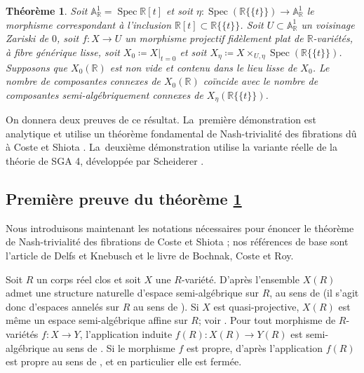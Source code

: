 \documentclass[JEP,XML,SOM,Unicode,francais,published]{cedram}
\newtheorem{thm}{Théorème}[section]
\theoremstyle{definition}
\newcommand{\R}{\mathbb R}
\newcommand{\A}{\mathbb A}
\newcommand{\Spec}{\operatorname{Spec}}
\newcommand{\puiseux}{\mathbb{R}\{\!\{t\}\!\}}
\begin{document}
\begin{thm}\label{critere-connexe}
Soit $\A^1_\R=\Spec \R[t]$ et soit $\eta\colon \Spec(\puiseux)\to \A^1_\R$ le morphisme correspondant à l'inclusion $\R[t]\subset \puiseux$. Soit $U\subset \A^1_\R$ un voisinage Zariski de $0$, soit $f\colon X\to U$ un morphisme projectif fidèlement plat de $\R$-variétés, à fibre générique lisse, soit $X_0\coloneqq X|_{t=0}$ et soit $X_\eta\coloneqq X\times_{U,\eta}\Spec(\puiseux)$. Supposons que $X_0(\R)$ est non vide et contenu dans le lieu lisse de $X_0$. Le nombre de composantes connexes de $X_0(\R)$ coïncide avec le nombre de composantes semi-algébriquement connexes de $X_\eta(\puiseux)$.
\end{thm}

On donnera deux preuves de ce résultat. La~première démonstration est analytique et utilise un théorème fondamental de Nash-trivialité des fibrations dû à Coste et Shiota \cite{coste1992nash}. La~deuxième démonstration utilise la variante réelle de la théorie de SGA 4, développée par Scheiderer \cite{scheiderer1994real}.

\subsection{Première preuve du théorème \ref{critere-connexe}}

Nous introduisons maintenant les notations nécessaires pour énoncer le théorème de Nash-trivialité des fibrations
de Coste et Shiota \cite{coste1992nash}; nos références de base sont l'article \cite{delfs1981semialgebraicII} de Delfs et Knebusch et le livre \cite{bochnak1998real} de Bochnak, Coste et Roy.

Soit $R$ un corps réel clos et soit $X$ une $R$-variété. D'après \cite[Ex.\,2 p.\,182]{delfs1981semialgebraicII} l'ensemble $X(R)$ admet une structure naturelle d'espace semi-algébrique sur $R$, au sens de \cite[Def.\,3 p.\,182]{delfs1981semialgebraicII} (il s'agit donc d'espaces annelés sur $R$ au sens de \cite[Def.\,2 p.\,182]{delfs1981semialgebraicII}). Si $X$ est quasi-projective, $X(R)$ est même un espace semi-algébrique affine sur $R$; voir \cite[Rem.\ p.\,182]{delfs1981semialgebraicII}. Pour tout morphisme de $R$-variétés $f\colon X\to Y$, l'application induite $f(R)\colon X(R)\to Y(R)$ est semi-algébrique au sens de \cite[p.\,184]{delfs1981semialgebraicII}. Si le morphisme $f$ est propre, d'après \cite[Th.\,9.6]{delfs1981semialgebraicII} l'application $f(R)$ est propre au sens de \cite[Def.\ p.\,192]{delfs1981semialgebraicII}, et en particulier elle est fermée.
\end{document}
